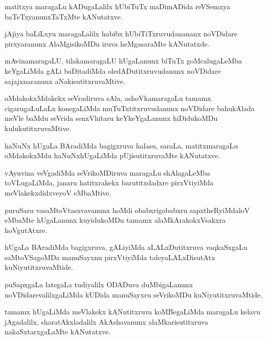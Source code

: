\documentclass{article}
\begin{document}
\begin{mn}
matitxya maragaLu kADugaLalilx hUbiTuTx maDimADida reVSemxya
baTeTxyanunxTaTxMte kANutatxve.
\end{mn}

\begin{mn}
jAjiya baLiLxyu maragaLalilx habibx hUbiTiTxruvudanananx noVDidare
pirxyaranunx AlaMgisikoMDu iruva heMgasaraMte kANutatxde.
\end{mn}

\begin{mn}
mAvinamaragaLU, tilakamaragaLU hUgaLanunx biTuTx goMcalugaLeMba
keYgaLiMda gALi baDitadiMda oledADutitxruvudanunx noVDidare
sajajxnaranunx aNakisutitxruvaMtive.
\end{mn}

\begin{mn}
oMdakokxMdakekx seVradiruva sAla, ashoVkamaragaLu tamamx
cigarugaLuLaLx konegaLiMda muTuTxtitxruvudanunx noVDidare bahukAlada
meVle baMdu seVrida senxVhitaru keYkeYgaLanunx hiDidukoMDu kulukutitxruvaMtive.
\end{mn}

\begin{mn}%
haNuNx hUgaLa BAradiMda bagigxruva halasu, saraLa, matitxmaragaLu
oMdakokxMdu haNuNxhUgaLiMda pUjisutitxruvaMte kANutatxve.
\end{mn}

\begin{mn}
vAyuvina veVgadiMda seVrikoMDiruva maragaLu shAlagaLeMba toVLugaLiMda,
janaru hatitxrakekx barutitxdadxre pirxVtiyiMda meVlakekxdidxveyoV eMbaMtive.
\end{mn}

\begin{mn}
puruSaru vasaMtoVtasxvavanunx hoMdi obabxrigobabxru sapxtheRyiMdaloV
eMbaMte hUgaLanunx kuyidukoMDu tamamx alaMkArakokxVsakxra hoVgutAtxre.
\end{mn}

\begin{mn}
hUgaLa BAradiMda bagigxruva, gALiyiMda aLALxDutitxruva vaqkaSxgaLu
saMtoVSagoMDa manuSayxnu pirxVtiyiMda taleyaLALxDisutAtx kuNiyutitxruvaMtide.
\end{mn}

\begin{mn}
puSapxgaLa lategaLa tudiyalilx ODADuva duMbigaLanunx
noVDidarevalilxgaLiMda kUDida manuSayxru seVrikoMDu kuNiyutitxruvaMtide.
\end{mn}

\begin{mn}%
tamamx hUgaLiMda meVlakekx kANutitxruva koMBegaLiMda maragaLu kelavu
jAgadalilx, sharatAkxladalilx AkAshavanunx alaMkarisutitxruva
nakaSxtarxgaLaMte kANutatxve.
\end{mn}
\end{document}
